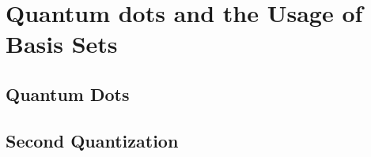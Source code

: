\chapter{Quantum dots and the Usage of Basis Sets}
\label{c:background}

\section{Quantum Dots}
\section{Second Quantization}